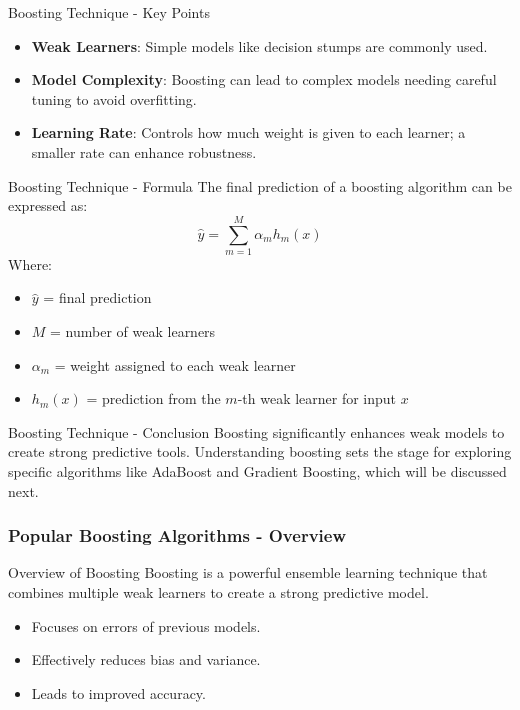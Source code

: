 \documentclass[aspectratio=169]{beamer}
\begin{document}
\begin{frame}[fragile]{Boosting Technique - Key Points}
    \begin{itemize}
        \item \textbf{Weak Learners}: Simple models like decision stumps are commonly used.
        \item \textbf{Model Complexity}: Boosting can lead to complex models needing careful tuning to avoid overfitting.
        \item \textbf{Learning Rate}: Controls how much weight is given to each learner; a smaller rate can enhance robustness.
    \end{itemize}
\end{frame}

\begin{frame}[fragile]{Boosting Technique - Formula}
    The final prediction of a boosting algorithm can be expressed as: 
    \begin{equation}
        \hat{y} = \sum_{m=1}^{M} \alpha_m h_m(x) 
    \end{equation}
    Where:
    \begin{itemize}
        \item \( \hat{y} \) = final prediction
        \item \( M \) = number of weak learners
        \item \( \alpha_m \) = weight assigned to each weak learner
        \item \( h_m(x) \) = prediction from the \( m \)-th weak learner for input \( x \)
    \end{itemize}
\end{frame}

\begin{frame}[fragile]{Boosting Technique - Conclusion}
    Boosting significantly enhances weak models to create strong predictive tools. Understanding boosting sets the stage for exploring specific algorithms like AdaBoost and Gradient Boosting, which will be discussed next.
\end{frame}

\begin{frame}[fragile]
    \frametitle{Popular Boosting Algorithms - Overview}
    \begin{block}{Overview of Boosting}
        Boosting is a powerful ensemble learning technique that combines multiple weak learners to create a strong predictive model. 
        \begin{itemize}
            \item Focuses on errors of previous models.
            \item Effectively reduces bias and variance.
            \item Leads to improved accuracy.
        \end{itemize}
    \end{block}
\end{frame}
\end{document}
